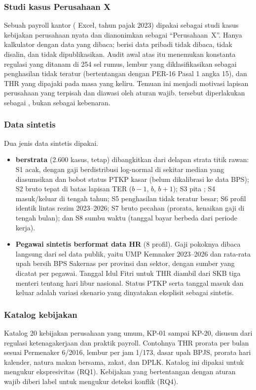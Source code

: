 \subsubsection{Studi kasus Perusahaan X}
Sebuah  payroll kantor ( Excel, tahun pajak 2023) dipakai sebagai studi kasus kebijakan perusahaan nyata dan dianonimkan sebagai ``Perusahaan~X''. Hanya  kalkulator dengan data  yang dibaca;  berisi data pribadi tidak dibaca, tidak disalin, dan tidak dipublikasikan. Audit awal atas  itu menemukan konstanta regulasi yang ditanam di 254 sel rumus, lembur yang diklasifikasikan sebagai penghasilan tidak teratur (bertentangan dengan PER-16 Pasal 1 angka 15), dan THR yang dipajaki pada masa yang keliru. Temuan ini menjadi motivasi lapisan perusahaan yang terpisah dan diawasi oleh aturan wajib.  tersebut diperlakukan sebagai , bukan sebagai kebenaran.

\subsubsection{Data sintetis}
Dua jenis data sintetis dipakai.
\begin{itemize}[leftmargin=*,nosep]
  \item \textbf{ berstrata} (2.600 kasus,  tetap) dibangkitkan dari delapan strata titik rawan: S1 acak, dengan gaji berdistribusi log-normal di sekitar median yang diasumsikan dan bobot status PTKP kasar (belum dikalibrasi ke data BPS); S2 bruto tepat di batas lapisan TER ($b-1$, $b$, $b+1$); S3 pita ; S4 masuk/keluar di tengah tahun; S5 penghasilan tidak teratur besar; S6 profil identik lintas rezim 2023--2026; S7 bruto pecahan (prorata, kenaikan gaji di tengah bulan); dan S8 sumbu waktu (tanggal bayar berbeda dari periode kerja).
  \item \textbf{Pegawai sintetis berformat data HR} (8 profil). Gaji pokoknya dibaca langsung dari sel data publik, yaitu UMP Kemnaker 2023--2026 dan rata-rata upah bersih BPS Sakernas per provinsi dan sektor, dengan sumber yang dicatat per pegawai. Tanggal Idul Fitri untuk THR diambil dari SKB tiga menteri tentang hari libur nasional. Status PTKP serta tanggal masuk dan keluar adalah variasi skenario yang dinyatakan eksplisit sebagai sintetis.
\end{itemize}

\subsubsection{Katalog kebijakan}
Katalog 20 kebijakan perusahaan yang umum, KP-01 sampai KP-20, disusun dari regulasi ketenagakerjaan dan praktik payroll. Contohnya THR prorata per bulan sesuai Permenaker 6/2016, lembur per jam 1/173, dasar upah BPJS, prorata hari kalender, natura makan bersama, zakat, dan DPLK. Katalog ini dipakai untuk mengukur ekspresivitas (RQ1). Kebijakan yang bertentangan dengan aturan wajib diberi label untuk mengukur deteksi konflik (RQ4).

